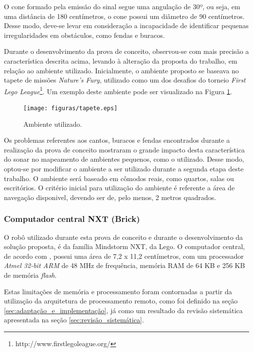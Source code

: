 \begin{itemize}
				O cone formado pela emissão do sinal segue uma angulação de 30º, ou seja, em uma distância de 180 centímetros, o cone possui um diâmetro de 90 centímetros. Desse modo, deve-se levar em consideração a incapacidade de identificar pequenas irregularidades em obstáculos, como fendas e buracos.

				Durante o desenvolvimento da prova de conceito, observou-se com mais precisão a característica descrita acima, levando à alteração da proposta do trabalho, em relação ao ambiente utilizado. Inicialmente, o ambiente proposto se baseava no tapete de missões \textit{Nature's Fury}, utilizado como um dos desafios do torneio \textit{First Lego League}\footnote{http://www.firstlegoleague.org/}. Um exemplo deste ambiente pode ser visualizado na Figura \ref{img:tapete}.

				\begin{figure}[H]
					\centering
					\texttt{[image: figuras/tapete.eps]}
					\caption[Ambiente Proposto Inicialmente]{Ambiente utilizado.}
					\label{img:tapete}
				\end{figure}

				Os problemas referentes aos cantos, buracos e fendas encontrados durante a realização da prova de conceito mostraram o grande impacto desta característica do sonar no mapeamento de ambientes pequenos, como o utilizado. Desse modo, optou-se por modificar o ambiente a ser utilizado durante a segunda etapa deste trabalho. O ambiente será baseado em cômodos reais, como quartos, salas ou escritórios. O critério inicial para utilização do ambiente é referente a área de navegação disponivel, devendo ser de, pelo menos, 2 metros quadrados.

		\end{itemize}

		\subsubsection{Computador central NXT (Brick)} %
		\label{sub:brick}

			O robô utilizado durante esta prova de conceito e durante o desenvolvimento da solução proposta, é da família Mindstorm NXT, da Lego. O computador central, de acordo com \cite{legonxj}, possui uma área de 7,2 x 11,2 centímetros, com um processador \textit{Atmel 32-bit ARM} de 48 MHz de frequência, memória RAM de 64 KB e 256 KB de memória \textit{flash}.

			Estas limitações de memória e processamento foram contornadas a partir da utilização da arquitetura de processamento remoto, como foi definido na seção \ref{sec:adaptação_e_implementação}, já como um resultado da revisão sistemática apresentada na seção \ref{sec:revisão_sistemática}.
